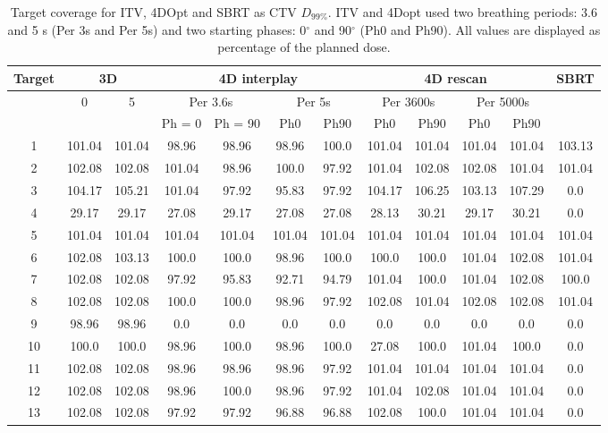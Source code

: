 \documentclass[type=dr, dr=rernat, accentcolor=tud7b,colorbacktitle, bigchapter, openright, twoside, 12pt ]{tudthesis}
\begin{document}
\begin{table}[H]
  \centering
  \footnotesize
  \caption{Target coverage for ITV, 4DOpt and SBRT as CTV $D_{99\%}$. ITV and 4Dopt used two breathing periods: 3.6 and 5 s (Per 3s and Per 5s) and
  two starting phases: 0$^\circ$ and 90$^\circ$ (Ph0 and Ph90). All values are displayed as percentage of the planned dose.}
  \begin{tabular}{|c|c|c|c|c|c|c|c|c|c|c|c|}
 \multirow{3}{*}{Target} & \multicolumn{2}{|c|}{3D} & \multicolumn{4}{|c|}{4D interplay} & \multicolumn{4}{|c|}{4D rescan} & \multirow{3}{*}{SBRT}\\ \hline
  & 0 & 5 & \multicolumn{2}{|c|}{Per 3.6s} & \multicolumn{2}{|c|}{Per 5s} & \multicolumn{2}{|c|}{Per 3600s} & \multicolumn{2}{|c|}{Per 5000s} & \\ \hline
  &   &   & Ph = 0 & Ph = 90 & Ph0 & Ph90 & Ph0 & Ph90 & Ph0 & Ph90 & \\
 \hline \hline 
1 & 101.04 & 101.04 & 98.96 & 98.96 & 98.96 & 100.0 & 101.04 & 101.04 & 101.04 & 101.04 & 103.13\\
2 & 102.08 & 102.08 & 101.04 & 98.96 & 100.0 & 97.92 & 101.04 & 102.08 & 102.08 & 101.04 & 101.04\\
3 & 104.17 & 105.21 & 101.04 & 97.92 & 95.83 & 97.92 & 104.17 & 106.25 & 103.13 & 107.29 & 0.0\\
4 & 29.17 & 29.17 & 27.08 & 29.17 & 27.08 & 27.08 & 28.13 & 30.21 & 29.17 & 30.21 & 0.0\\
5 & 101.04 & 101.04 & 101.04 & 101.04 & 101.04 & 101.04 & 101.04 & 101.04 & 101.04 & 101.04 & 101.04\\
6 & 102.08 & 103.13 & 100.0 & 100.0 & 98.96 & 100.0 & 100.0 & 100.0 & 101.04 & 102.08 & 101.04\\
7 & 102.08 & 102.08 & 97.92 & 95.83 & 92.71 & 94.79 & 101.04 & 100.0 & 101.04 & 102.08 & 100.0\\
8 & 102.08 & 102.08 & 100.0 & 100.0 & 98.96 & 97.92 & 102.08 & 101.04 & 102.08 & 102.08 & 101.04\\
9 & 98.96 & 98.96 & 0.0 & 0.0 & 0.0 & 0.0 & 0.0 & 0.0 & 0.0 & 0.0 & 0.0\\
10 & 100.0 & 100.0 & 98.96 & 100.0 & 98.96 & 100.0 & 27.08 & 100.0 & 101.04 & 100.0 & 0.0\\
11 & 102.08 & 102.08 & 98.96 & 98.96 & 98.96 & 97.92 & 101.04 & 101.04 & 101.04 & 101.04 & 0.0\\
12 & 102.08 & 102.08 & 98.96 & 100.0 & 98.96 & 97.92 & 101.04 & 102.08 & 101.04 & 101.04 & 0.0\\
13 & 102.08 & 102.08 & 97.92 & 97.92 & 96.88 & 96.88 & 102.08 & 100.0 & 101.04 & 101.04 & 0.0\\

\end{tabular}
\end{table}
\end{document}
